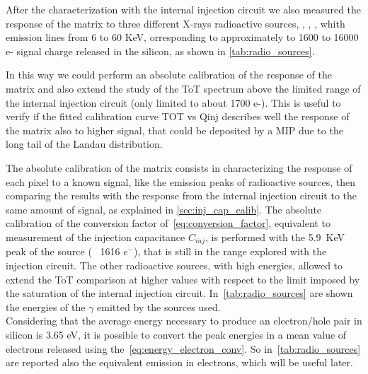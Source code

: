 After the characterization with the internal injection circuit we also measured the response of the matrix to three different X-rays radioactive sources, , , , whith emission lines from 6 to 60 KeV, orresponding to approximately to 1600 to 16000 e- signal charge released in the silicon, as shown in \autoref{tab:radio_sources}.

In this way we could perform an absolute calibration of the response of the matrix and also extend the study of the ToT spectrum above the limited range of the internal injection circuit (only limited to about 1700 e-). This is useful to verify if the fitted calibration curve TOT vs Qinj describes well the response of the matrix also to higher signal, that could be deposited by a MIP due to the long tail of the Landau distribution. 

The absolute calibration of the matrix consists in characterizing the response of each pixel to a known signal, like the emission peaks of radioactive sources, then comparing the results with the response from the internal injection circuit to the same amount of signal, as explained in \autoref{sec:inj_cap_calib}. 
The absolute calibration of the conversion factor of~\autoref{eq:conversion_factor}, equivalent to measurement of the injection capacitance $C_{inj}$,  is performed with the \SI{5.9}{KeV} peak of the  source (~ 1616 $e^{-}$), that is still in the range explored with the injection circuit. The other radioactive sources, with high energies, allowed to extend the ToT comparison at higher values with respect to the limit imposed by the saturation of the internal injection circuit. In~\autoref{tab:radio_sources} are shown the energies of the $\gamma$ emitted by the sources used.\\
Considering that the average energy necessary to produce an electron/hole pair in silicon is 3.65 eV, it is possible to convert the peak energies in a mean value of electrons released using the~\autoref{eq:energy_electron_conv}. So in~\autoref{tab:radio_sources} are reported also the equivalent emission in electrons, which will be useful later.

